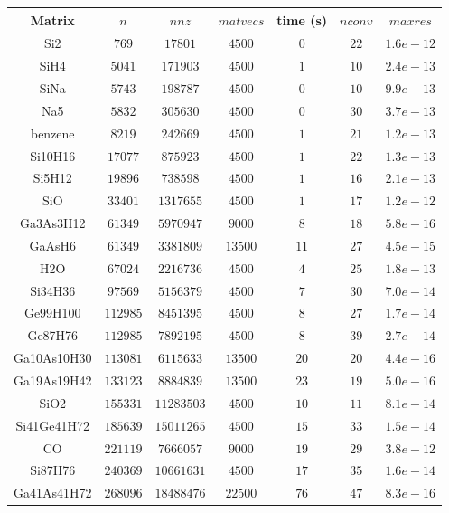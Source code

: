 \begin{tabular}{c|c|c|c|c|c|c}
Matrix & $n$ & $nnz$ & $matvecs$ & time (s) & $nconv$ & $maxres$ \\\hline
Si2 & $769$ & $17801$ & $4500$ & $0$ & $22$ & $1.6e-12$ \\
SiH4 & $5041$ & $171903$ & $4500$ & $1$ & $10$ & $2.4e-13$ \\
SiNa & $5743$ & $198787$ & $4500$ & $0$ & $10$ & $9.9e-13$ \\
Na5 & $5832$ & $305630$ & $4500$ & $0$ & $30$ & $3.7e-13$ \\
benzene & $8219$ & $242669$ & $4500$ & $1$ & $21$ & $1.2e-13$ \\
Si10H16 & $17077$ & $875923$ & $4500$ & $1$ & $22$ & $1.3e-13$ \\
Si5H12 & $19896$ & $738598$ & $4500$ & $1$ & $16$ & $2.1e-13$ \\
SiO & $33401$ & $1317655$ & $4500$ & $1$ & $17$ & $1.2e-12$ \\
Ga3As3H12 & $61349$ & $5970947$ & $9000$ & $8$ & $18$ & $5.8e-16$ \\
GaAsH6 & $61349$ & $3381809$ & $13500$ & $11$ & $27$ & $4.5e-15$ \\
H2O & $67024$ & $2216736$ & $4500$ & $4$ & $25$ & $1.8e-13$ \\
Si34H36 & $97569$ & $5156379$ & $4500$ & $7$ & $30$ & $7.0e-14$ \\
Ge99H100 & $112985$ & $8451395$ & $4500$ & $8$ & $27$ & $1.7e-14$ \\
Ge87H76 & $112985$ & $7892195$ & $4500$ & $8$ & $39$ & $2.7e-14$ \\
Ga10As10H30 & $113081$ & $6115633$ & $13500$ & $20$ & $20$ & $4.4e-16$ \\
Ga19As19H42 & $133123$ & $8884839$ & $13500$ & $23$ & $19$ & $5.0e-16$ \\
SiO2 & $155331$ & $11283503$ & $4500$ & $10$ & $11$ & $8.1e-14$ \\
Si41Ge41H72 & $185639$ & $15011265$ & $4500$ & $15$ & $33$ & $1.5e-14$ \\
CO & $221119$ & $7666057$ & $9000$ & $19$ & $29$ & $3.8e-12$ \\
Si87H76 & $240369$ & $10661631$ & $4500$ & $17$ & $35$ & $1.6e-14$ \\
Ga41As41H72 & $268096$ & $18488476$ & $22500$ & $76$ & $47$ & $8.3e-16$ \\
\end{tabular}